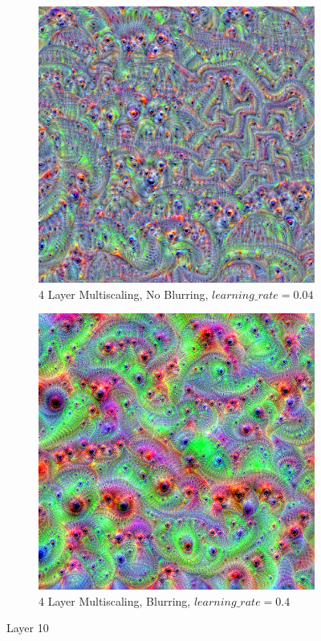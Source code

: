 \begin{figure}
    \captionsetup{justification=centering}
    
    \begin{subfigure}[t]{0.42\textwidth}
        \captionsetup{justification=centering}
        \centering
        \includegraphics[width=.7\linewidth]{figuras/feat_vis/experiments/final/l10/random_image_pl4_lr4e-2_layer21_no-blur.png}
        \caption{4 Layer Multiscaling, No Blurring, \(learning\_rate = 0.04\)}
    \end{subfigure}
    \hfill
    \begin{subfigure}[t]{0.42\textwidth}
        \captionsetup{justification=centering}
        \centering
        \includegraphics[width=.7\linewidth]{figuras/feat_vis/experiments/final/l10/random_image_pl4_lr4e-1_layer21.png}
        \caption{4 Layer Multiscaling, Blurring, \(learning\_rate = 0.4\)}
    \end{subfigure}
    
    \caption{Layer 10}
    \label{fig:layer_10}
\end{figure}

